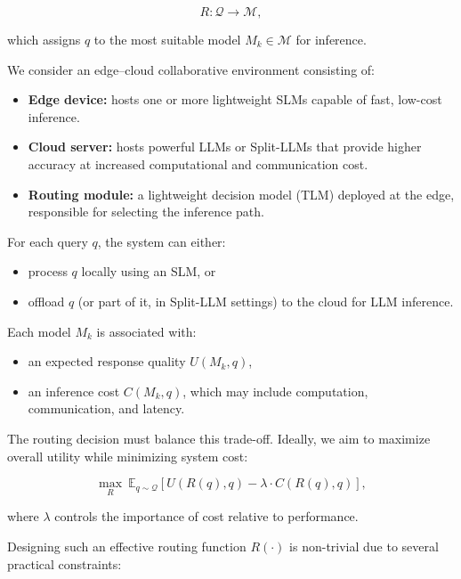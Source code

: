 \documentclass[lettersize,journal]{IEEEtran}
\begin{document}
\begin{equation}
    R: \mathcal{Q} \rightarrow \mathcal{M},
\end{equation}

which assigns $q$ to the most suitable model $M_k \in \mathcal{M}$ for inference.

We consider an edge–cloud collaborative environment consisting of:

\begin{itemize}
    \item \textbf{Edge device:} hosts one or more lightweight SLMs capable of fast, low-cost inference.
    \item \textbf{Cloud server:} hosts powerful LLMs or Split-LLMs that provide higher accuracy at increased computational and communication cost.
    \item \textbf{Routing module:} a lightweight decision model (TLM) deployed at the edge, responsible for selecting the inference path.
\end{itemize}

For each query $q$, the system can either:
\begin{itemize}
    \item process $q$ locally using an SLM, or
    \item offload $q$ (or part of it, in Split-LLM settings) to the cloud for LLM inference.
\end{itemize}

Each model $M_k$ is associated with:

\begin{itemize}
    \item an expected response quality $U(M_k, q)$,
    \item an inference cost $C(M_k, q)$, which may include computation, communication, and latency.
\end{itemize}

The routing decision must balance this trade-off. Ideally, we aim to maximize overall utility while minimizing system cost:

\begin{equation}
    \max_{R} \ \mathbb{E}_{q \sim \mathcal{Q}} \left[ U(R(q), q) - \lambda \cdot C(R(q), q) \right],
\end{equation}

where $\lambda$ controls the importance of cost relative to performance.

Designing such an effective routing function $R(\cdot)$ is non-trivial due to several practical constraints:
\end{document}

